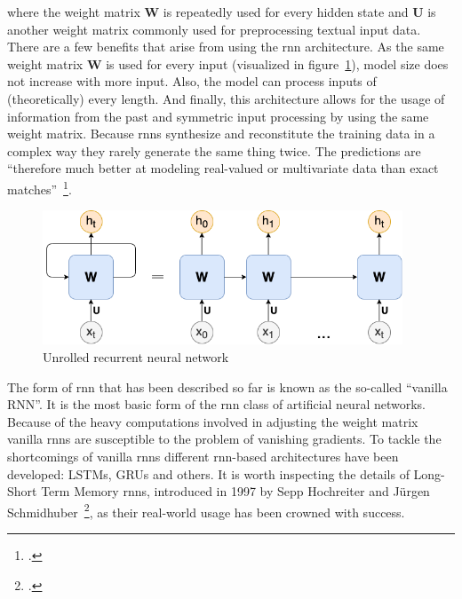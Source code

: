where the weight matrix $ \boldsymbol{W} $ is repeatedly used for every hidden state and $ \boldsymbol{U} $ is another weight matrix commonly used for preprocessing textual input data. There are a few benefits that arise from using the \gls{rnn} architecture. As the same weight matrix $ \boldsymbol{W} $ is used for every input (visualized in figure~\ref{fig:recurrent_neural_network_architecture}), model size does not increase with more input. Also, the model can process inputs of (theoretically) every length. And finally, this architecture allows for the usage of information from the past and symmetric input processing by using the same weight matrix. Because \gls{rnn}s synthesize and reconstitute the training data in a complex way they rarely generate the same thing twice. The predictions are “therefore much better at modeling real-valued or multivariate data than exact matches”~\footcite[2]{DBLP:journals/corr/Graves13}.

\begin{figure}[h]
  	\includegraphics[height=4cm]{drawings/rnn}
  	\caption{Unrolled recurrent neural network}
	\label{fig:recurrent_neural_network_architecture}
\end{figure}

The form of \gls{rnn} that has been described so far is known as the so-called “vanilla RNN”. It is the most basic form of the \gls{rnn} class of artificial neural networks. Because of the heavy computations involved in adjusting the weight matrix vanilla \gls{rnn}s are susceptible to the problem of vanishing gradients. To tackle the shortcomings of vanilla \gls{rnn}s different \gls{rnn}-based architectures have been developed: LSTMs, GRUs and others. It is worth inspecting the details of Long-Short Term Memory \gls{rnn}s, introduced in 1997 by Sepp Hochreiter and Jürgen Schmidhuber~\footcite{818041}, as their real-world usage has been crowned with success.

\bigskip

